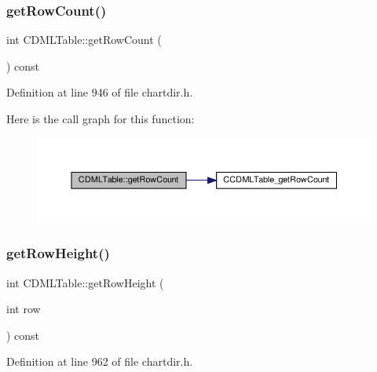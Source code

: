 \subsubsection{\texorpdfstring{get\+Row\+Count()}{getRowCount()}}
{\footnotesize\ttfamily int C\+D\+M\+L\+Table\+::get\+Row\+Count (\begin{DoxyParamCaption}{ }\end{DoxyParamCaption}) const\hspace{0.3cm}{\ttfamily [inline]}}



Definition at line 946 of file chartdir.\+h.

Here is the call graph for this function\+:
\nopagebreak
\begin{figure}[H]
\begin{center}
\leavevmode
\includegraphics[width=350pt]{class_c_d_m_l_table_aef39ffb95d09fd1cf91e9c982e5d835f_cgraph}
\end{center}
\end{figure}
\mbox{\label{class_c_d_m_l_table_a3cf2436c72b48dd1f97fb9ffd26c96be}} 
\subsubsection{\texorpdfstring{get\+Row\+Height()}{getRowHeight()}}
{\footnotesize\ttfamily int C\+D\+M\+L\+Table\+::get\+Row\+Height (\begin{DoxyParamCaption}\item[{int}]{row }\end{DoxyParamCaption}) const\hspace{0.3cm}{\ttfamily [inline]}}



Definition at line 962 of file chartdir.\+h.

